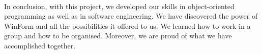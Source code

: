 \documentclass[12pt,oneside]{report}
\begin{document}
    \paragraph{}
    In conclusion, with this project, we developed our skills in object-oriented programming as well as in software engineering. We have discovered the power of WinForm and all the possibilities it offered to us. We learned how to work in a group and how to be organised. Moreover, we are proud of what we have accomplished together.



\end{document}
